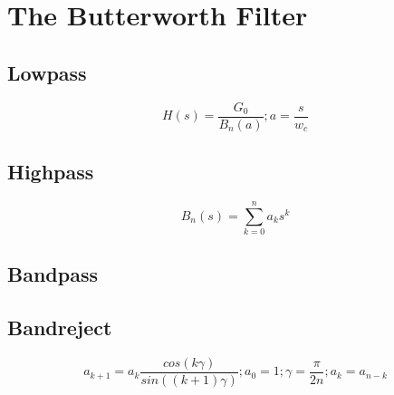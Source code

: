 \documentclass[american, twoside]{article}
\begin{document}
\section{The Butterworth Filter} \label{Butterworth}
\subsection{Lowpass} \label{Butterworth:Lowpass}
\begin{equation} \label{butterworth:lowpass_generic}
    H(s) = \frac{G_{0}}{B_{n}(a)}; a = \frac{s}{w_{c}}
\end{equation}

\subsection{Highpass} \label{Butterworth:Highpass}
\begin{equation} \label{butterworth:polynomial}
    B_{n}(s) = \sum_{k = 0}^{n} a_{k}s^{k}
\end{equation}

\subsection{Bandpass} \label{Butterworth:Bandpass}
\subsection{Bandreject} \label{Butterworth:Bandreject}
\begin{equation} \label{butterowrth:coefficients}
    a_{k + 1} = a_{k}\frac{cos\left(k\gamma\right)}{sin((k + 1)\gamma)}; a_{0} = 1; \gamma = \frac{\pi}{2n}; a_{k} = a_{n - k}
\end{equation}

\newpage
\printbibliography[heading=bibintoc]
\end{document}
